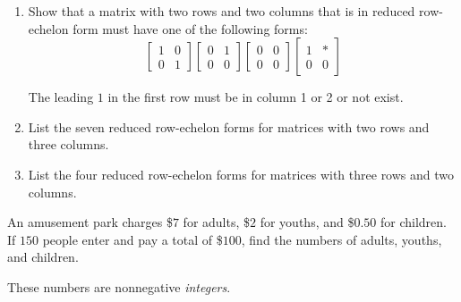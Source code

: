 \documentclass{ximera}
\begin{document}
\begin{problem}\label{prb:2x2rref_forms}

\begin{enumerate}
\item Show that a matrix with two rows and two columns that is in reduced row-echelon form must have one of the following forms:
\begin{equation*}
\begin{bmatrix}
1 & 0 \\
0 & 1
\end{bmatrix}
\begin{bmatrix}
0 & 1 \\
0 & 0
\end{bmatrix}
\begin{bmatrix}
0 & 0 \\
0 & 0
\end{bmatrix}
\begin{bmatrix}
1 & * \\
0 & 0
\end{bmatrix}
\end{equation*}

\begin{hint}
 The leading $1$ in the first row must be in column 1 or 2 or not exist.
\end{hint}

\item List the seven reduced row-echelon forms for matrices with two rows and three columns.

\item List the four reduced row-echelon forms for matrices with three rows and two columns.

\end{enumerate}
\end{problem}

\begin{problem}\label{prb:amusement}
An amusement park charges \$$7$ for adults, \$$2$ for youths, and \$$0.50$ for
children. If $150$ people enter and pay a total of \$$100$, find the numbers
of adults, youths, and children.
\begin{hint}
These numbers are nonnegative \textit{integers}.
\end{hint}

\end{problem}
\end{document}
